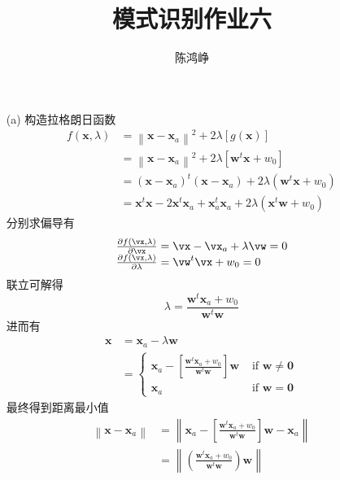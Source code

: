 \documentclass[reportComp]{thesis}
\title{模式识别作业六}
\author{陈鸿峥}
\begin{document}
\maketitle

\begin{answer}[\textsection 5 Q4]
\begin{itemize}
	\item [(a)] 构造拉格朗日函数
	\[\begin{aligned}f(\mathbf{x}, \lambda)&=\left\|\mathbf{x}-\mathbf{x}_{a}\right\|^{2}+2 \lambda[g(\mathbf{x})]\\
	&=\left\|\mathbf{x}-\mathbf{x}_{a}\right\|^{2}+2 \lambda\left[\mathbf{w}^{t} \mathbf{x}+w_{0}\right] \\
	&=\left(\mathbf{x}-\mathbf{x}_{a}\right)^{t}\left(\mathbf{x}-\mathbf{x}_{a}\right)+2 \lambda\left(\mathbf{w}^{t} \mathbf{x}+w_{0}\right) \\
	&=\mathbf{x}^{t} \mathbf{x}-2 \mathbf{x}^{t} \mathbf{x}_{a}+\mathbf{x}_{a}^{t} \mathbf{x}_{a}+2 \lambda\left(\mathbf{x}^{t} \mathbf{w}+w_{0}\right)
	\end{aligned}\]
	分别求偏导有
	\[\begin{array}{l}
	{\frac{\partial f(\vx, \lambda)}{\partial \vx}=\vx-\vx_{a}+\lambda \vw=0} \\
	{\frac{\partial f(\vx, \lambda)}{\partial \lambda}=\vw^{t} \vx+w_{0}=0}
	\end{array}\]
	联立可解得
	\[\lambda=\frac{\mathbf{w}^{t} \mathbf{x}_{a}+w_{0}}{\mathbf{w}^{t} \mathbf{w}}\]
	进而有
	\[\begin{aligned} \mathbf{x} &=\mathbf{x}_{a}-\lambda \mathbf{w} \\
	&=\left\{\begin{array}{ll}
	{\mathbf{x}_{a}-\left[\frac{\mathbf{w}^{t} \mathbf{x}_{a}+w_{0}}{\mathbf{w}^{t} \mathbf{w}}\right] \mathbf{w}} & {\text { if } \mathbf{w} \neq \mathbf{0}} \\
	{\mathbf{x}_{a}} & {\text { if } \mathbf{w}=\mathbf{0}}
	\end{array}
	\right.\end{aligned}\]
	最终得到距离最小值
	\[\begin{aligned}
	\left\|\mathbf{x}-\mathbf{x}_{a}\right\| &=\left\|\mathbf{x}_{a}-\left[\frac{\mathbf{w}^{t} \mathbf{x}_{a}+w_{0}}{\mathbf{w}^{t} \mathbf{w}}\right] \mathbf{w}-\mathbf{x}_{a}\right\| \\
	&=\left\|\left(\frac{\mathbf{w}^{t} \mathbf{x}_{a}+w_{0}}{\mathbf{w}^{t} \mathbf{w}}\right) \mathbf{w}\right\| \\

\end{aligned}\]
\end{itemize}
\end{answer}
\end{document}

